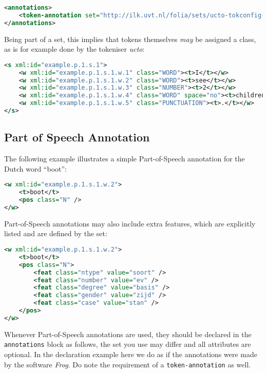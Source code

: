 \documentclass[a4paper,12pt]{report}
\begin{document}
\begin{lstlisting}[language=xml]
<annotations>
    <token-annotation set="http://ilk.uvt.nl/folia/sets/ucto-tokconfig-nl" annotator="ucto" annotatortype="auto" />
</annotations>
\end{lstlisting}

Being part of a set, this implies that tokens themselves \emph{may} be assigned a class, as is for example done by the tokeniser \emph{ucto}:

\begin{lstlisting}[language=xml]
<s xml:id="example.p.1.s.1">
    <w xml:id="example.p.1.s.1.w.1" class="WORD"><t>I</t></w>
    <w xml:id="example.p.1.s.1.w.2" class="WORD"><t>see</t></w>
    <w xml:id="example.p.1.s.1.w.3" class="NUMBER"><t>2</t></w>
    <w xml:id="example.p.1.s.1.w.4" class="WORD" space="no"><t>children</t></w>
    <w xml:id="example.p.1.s.1.w.5" class="PUNCTUATION"><t>.</t></w>
</s>
\end{lstlisting}        


\subsection{Part of Speech Annotation}

The following example illustrates a simple Part-of-Speech annotation for the Dutch word ``boot'':

\begin{lstlisting}[language=xml]
<w xml:id="example.p.1.s.1.w.2">
    <t>boot</t>
    <pos class="N" />
</w>
\end{lstlisting}

Part-of-Speech annotations may also include extra features, which are explicitly listed and are defined by the set:

\begin{lstlisting}[language=xml]
<w xml:id="example.p.1.s.1.w.2">
    <t>boot</t>
    <pos class="N">
        <feat class="ntype" value="soort" />
        <feat class="number" value="ev" />
        <feat class="degree" value="basis" />
        <feat class="gender" value="zijd" />
        <feat class="case" value="stan" />
    </pos>
</w>
\end{lstlisting}

Whenever Part-of-Speech annotations are used, they should be declared in the \texttt{annotations} block as follows, the set you use may differ and all attributes are optional. In the declaration example here we do as if the annotations were made by the software \emph{Frog}. Do note the requirement of a \texttt{token-annotation} as well.
\end{document}
